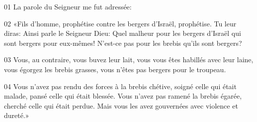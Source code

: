 01 La parole du Seigneur me fut adressée:

02 «Fils d’homme, prophétise contre les bergers d’Israël, prophétise. Tu leur diras: Ainsi parle le Seigneur Dieu: Quel malheur pour les bergers d’Israël qui sont bergers pour eux-mêmes! N’est-ce pas pour les brebis qu’ils sont bergers?

03 Vous, au contraire, vous buvez leur lait, vous vous êtes habillés avec leur laine, vous égorgez les brebis grasses, vous n’êtes pas bergers pour le troupeau.

04 Vous n’avez pas rendu des forces à la brebis chétive, soigné celle qui était malade, pansé celle qui était blessée. Vous n’avez pas ramené la brebis égarée, cherché celle qui était perdue. Mais vous les avez gouvernées avec violence et dureté.»
